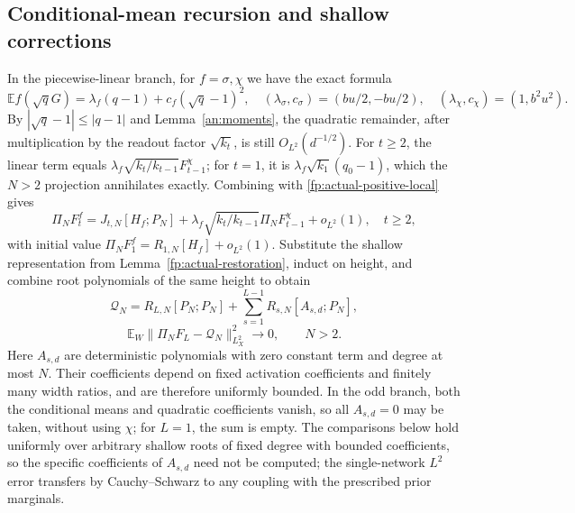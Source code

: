 \documentclass[a4paper]{tufte-handout}
\newcommand{\E}{\mathbb E}
\begin{document}
\begin{fullwidth}
\subsection{Conditional-mean recursion and shallow corrections}
\label{fp:actual-mean}\label{fp:actual-masked-formula}
In the piecewise-linear branch, for $f=\sigma,\chi$ we have the exact formula
\begin{equation}\label{fp:actual-root-mean}
 \E f(\sqrt qG)=\lambda_f(q-1)+c_f(\sqrt q-1)^2,
 \quad (\lambda_\sigma,c_\sigma)=(bu/2,-bu/2),\quad
 (\lambda_\chi,c_\chi)=(1,b^2u^2).
\end{equation}
By $|\sqrt q-1|\le|q-1|$ and Lemma~\ref{an:moments}, the quadratic remainder, after multiplication by the readout factor $\sqrt{k_t}$,
is still $O_{L^2}(d^{-1/2})$. For $t\ge2$, the linear term equals
$\lambda_f\sqrt{k_t/k_{t-1}}F_{t-1}^\chi$; for $t=1$, it is
$\lambda_f\sqrt{k_1}(q_0-1)$, which the $N>2$ projection annihilates exactly.
Combining with \eqref{fp:actual-positive-local} gives
\begin{equation}\label{fp:actual-cancel-recursion}
 \Pi_NF_t^f=J_{t,N}[H_f;P_N]
 +\lambda_f\sqrt{k_t/k_{t-1}}\Pi_NF_{t-1}^\chi+o_{L^2}(1),
 \quad t\ge2,
\end{equation}
with initial value $\Pi_NF_1^f=R_{1,N}[H_f]+o_{L^2}(1)$.
Substitute the shallow representation from Lemma~\ref{fp:actual-restoration}, induct on height, and combine root polynomials of the same height to obtain
\begin{equation}\label{fp:actual-U}
 \mathcal Q_N=R_{L,N}[P_N;P_N]
 +\sum_{s=1}^{L-1}R_{s,N}[A_{s,d};P_N],
\end{equation}
\begin{equation}\label{fp:actual-final}
 \boxed{\E_W\|\Pi_NF_L-\mathcal Q_N\|_{L^2_X}^2\longrightarrow0,\qquad N>2.}
\end{equation}
Here $A_{s,d}$ are deterministic polynomials with zero constant term and degree at most $N$. Their coefficients depend on fixed activation coefficients and
finitely many width ratios, and are therefore uniformly bounded. In the odd branch, both the conditional means and quadratic coefficients vanish,
so all $A_{s,d}=0$ may be taken, without using $\chi$; for $L=1$, the sum is empty.
The comparisons below hold uniformly over arbitrary shallow roots of fixed degree with bounded coefficients, so the specific coefficients of $A_{s,d}$ need not be computed; the single-network $L^2$ error transfers by
Cauchy--Schwarz to any coupling with the prescribed prior marginals.


\end{fullwidth}
\end{document}
